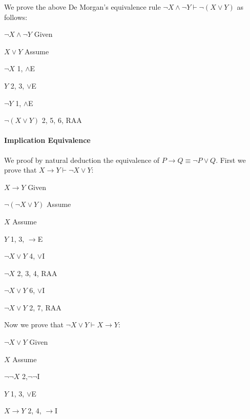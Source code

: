 \documentclass{article}
\newcommand{\indentitem}{\addtolength\itemindent{20pt}}
\theoremstyle{plain}
\theoremstyle{definition}
\begin{document}
\begin{multicols}{2}
\noindent We prove the above De Morgan's equivalence rule $\lnot X \land \lnot Y \vdash \lnot (X \lor Y)$ as follows:

\begin{enumerate}
\item $\lnot X \land \lnot Y$ \hfill Given
{\indentitem
\item $X \lor Y$ \hfill Assume
\item $\lnot X$ \hfill 1, $\land$E
\item $Y$ \hfill 2, 3, $\lor$E
\item $\lnot Y$ \hfill 1, $\land$E
}
\item $\lnot (X \lor Y)$ \hfill 2, 5, 6, RAA
\end{enumerate}

\paragraph{Implication Equivalence} We proof by natural deduction the equivalence of $P \rightarrow Q \equiv \lnot P \lor Q$. First we prove that $X \rightarrow Y \vdash \lnot X \lor Y$:

\begin{enumerate}
\item $X \rightarrow Y$ \hfill Given
{\indentitem
\item $\lnot (\lnot X \lor Y)$ \hfill Assume
{\indentitem
\item $X$ \hfill Assume
\item $Y$ \hfill 1, 3, $\rightarrow$E
\item $\lnot X \lor Y$ \hfill 4, $\lor$I
}
\item $\lnot X$ \hfill 2, 3, 4, RAA
\item $\lnot X \lor Y$ \hfill 6, $\lor$I
}
\item $\lnot X \lor Y$ \hfill 2, 7, RAA
\end{enumerate}

\noindent Now we prove that $\lnot X \lor Y \vdash X \rightarrow Y$:

\begin{enumerate}
\item $\lnot X \lor Y$ \hfill Given
{\indentitem
\item $X$ \hfill Assume
\item $\lnot\lnot X$ \hfill 2,$\lnot\lnot$I
\item $Y$ \hfill 1, 3, $\lor$E
}
\item $X \rightarrow Y$ \hfill 2, 4, $\rightarrow$I
\end{enumerate}
  


\end{multicols}
\end{document}
